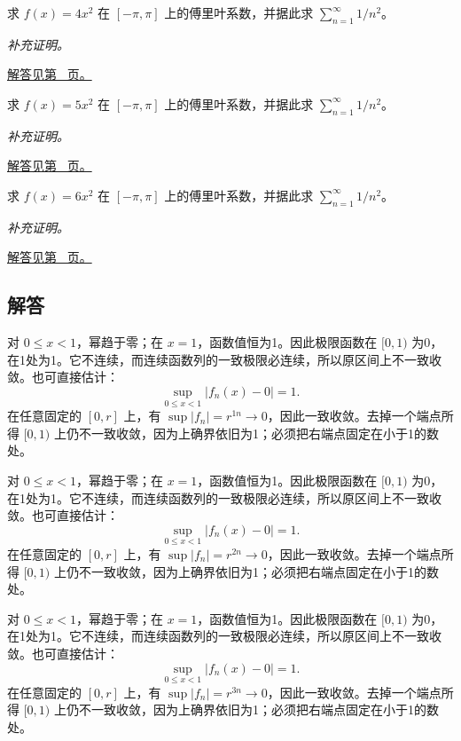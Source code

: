 \documentclass[UTF8,12pt,a4paper,fontset=fandol]{ctexart}
\begin{document}
\begin{example}[平方函数的余弦展开]\label{ex:c28q22}
求 $f(x)=4x^2$ 在 $[-\pi,\pi]$ 上的傅里叶系数，并据此求 $\sum_{n=1}^\infty1/n^2$。
\par\textit{补充证明。}\par\hyperref[ans:c28q22]{解答见第~\pageref{ans:c28q22} 页。}
\end{example}
\begin{example}[平方函数的余弦展开]\label{ex:c28q23}
求 $f(x)=5x^2$ 在 $[-\pi,\pi]$ 上的傅里叶系数，并据此求 $\sum_{n=1}^\infty1/n^2$。
\par\textit{补充证明。}\par\hyperref[ans:c28q23]{解答见第~\pageref{ans:c28q23} 页。}
\end{example}
\begin{example}[平方函数的余弦展开]\label{ex:c28q24}
求 $f(x)=6x^2$ 在 $[-\pi,\pi]$ 上的傅里叶系数，并据此求 $\sum_{n=1}^\infty1/n^2$。
\par\textit{补充证明。}\par\hyperref[ans:c28q24]{解答见第~\pageref{ans:c28q24} 页。}
\end{example}
\subsection{解答}
\begin{solve}\label{ans:c28q1}
对 $0\le x<1$，幂趋于零；在 $x=1$，函数值恒为1。因此极限函数在 $[0,1)$ 为0，在1处为1。它不连续，而连续函数列的一致极限必连续，所以原区间上不一致收敛。也可直接估计：
\[
\sup_{0\le x<1}|f_n(x)-0|=1.
\]
在任意固定的 $[0,r]$ 上，有 $\sup|f_n|=r^{1n}\to0$，因此一致收敛。去掉一个端点所得 $[0,1)$ 上仍不一致收敛，因为上确界依旧为1；必须把右端点固定在小于1的数处。
\end{solve}

\begin{solve}\label{ans:c28q2}
对 $0\le x<1$，幂趋于零；在 $x=1$，函数值恒为1。因此极限函数在 $[0,1)$ 为0，在1处为1。它不连续，而连续函数列的一致极限必连续，所以原区间上不一致收敛。也可直接估计：
\[
\sup_{0\le x<1}|f_n(x)-0|=1.
\]
在任意固定的 $[0,r]$ 上，有 $\sup|f_n|=r^{2n}\to0$，因此一致收敛。去掉一个端点所得 $[0,1)$ 上仍不一致收敛，因为上确界依旧为1；必须把右端点固定在小于1的数处。
\end{solve}

\begin{solve}\label{ans:c28q3}
对 $0\le x<1$，幂趋于零；在 $x=1$，函数值恒为1。因此极限函数在 $[0,1)$ 为0，在1处为1。它不连续，而连续函数列的一致极限必连续，所以原区间上不一致收敛。也可直接估计：
\[
\sup_{0\le x<1}|f_n(x)-0|=1.
\]
在任意固定的 $[0,r]$ 上，有 $\sup|f_n|=r^{3n}\to0$，因此一致收敛。去掉一个端点所得 $[0,1)$ 上仍不一致收敛，因为上确界依旧为1；必须把右端点固定在小于1的数处。
\end{solve}
\end{document}
